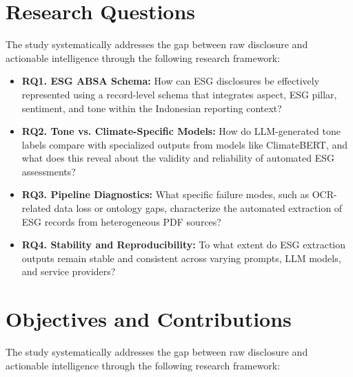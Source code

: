 \section{Research Questions}

The study systematically addresses the gap between raw disclosure and actionable intelligence through the following research framework:
\begin{itemize}
\item 

\textbf{RQ1. ESG ABSA Schema:} How can ESG disclosures be effectively represented using a record-level schema that integrates aspect, ESG pillar, sentiment, and tone within the Indonesian reporting context?\item 

\textbf{RQ2. Tone vs. Climate-Specific Models:} How do LLM-generated tone labels compare with specialized outputs from models like ClimateBERT, and what does this reveal about the validity and reliability of automated ESG assessments?\item 

\textbf{RQ3. Pipeline Diagnostics:} What specific failure modes, such as OCR-related data loss or ontology gaps, characterize the automated extraction of ESG records from heterogeneous PDF sources?\item 

\textbf{RQ4. Stability and Reproducibility:} To what extent do ESG extraction outputs remain stable and consistent across varying prompts, LLM models, and service providers?
\end{itemize}
\section{Objectives and Contributions}

The study systematically addresses the gap between raw disclosure and actionable intelligence through the following research framework:
